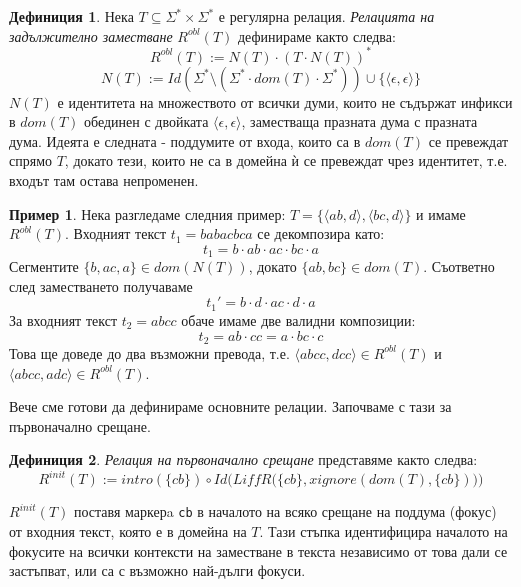 \documentclass[12pt, oneside]{article}
\theoremstyle{definition}
\newtheorem{definition}{Дефиниция}[section]
\newtheorem{example}{Пример}[section]
\begin{document}
\begin{definition}\label{def:Robl}
	Нека \(T \subseteq \Sigma^* \times \Sigma^* \) е регулярна релация. \emph{Релацията на задължително заместване} \(R^{obl}(T)\) дефинираме както следва:
	\[ R^{obl}(T) := N(T) \cdot (T \cdot N(T))^* \]
	\[ N(T) := Id(\Sigma^* \setminus (\Sigma^* \cdot dom(T) \cdot \Sigma^*)) \cup \{ \langle \epsilon, \epsilon \rangle \} \]
	\(N(T)\) е идентитета на множеството от всички думи, които не съдържат инфикси в \(dom(T)\) обединен с двойката \(\langle \epsilon, \epsilon \rangle\), заместваща празната дума с празната дума.
	Идеята е следната - поддумите от входа, които са в \(dom(T)\) се превеждат спрямо \(T\), докато тези, които не са в домейна ѝ се превеждат чрез идентитет, т.е. входът там остава непроменен.
\end{definition}

\begin{example}
	Нека разгледаме следния пример: \(T = \{ \langle ab, d \rangle, \langle bc, d \rangle \} \) и имаме \(R^{obl}(T) \). Входният текст \( t_1 = babacbca \) се декомпозира като:
	\[ t_1 = b \cdot ab \cdot ac \cdot bc \cdot a \]
	Сегментите \(\{b, ac, a\} \in dom(N(T))\), докато \(\{ab, bc\} \in dom(T)\). Съответно след заместването получаваме
	\[ t_1' = b \cdot d \cdot ac \cdot d \cdot a \]
	За входният текст \( t_2 = abcc \) обаче имаме две валидни композиции:
	\[ t_2 = ab \cdot cc = a \cdot bc \cdot c \]
	Това ще доведе до два възможни превода, т.е. \( \langle abcc, dcc \rangle \in R^{obl}(T) \) и \( \langle abcc, adc \rangle \in R^{obl}(T) \).
\end{example}

Вече сме готови да дефинираме основните релации. Започваме с тази за първоначално срещане.

\begin{definition}\label{def:Rinit} \emph{Релация на първоначално срещане} представяме както следва:
	\[ R^{init}(T) := intro(\{ cb \}) \circ Id \Big(LiffR \big(\{ cb \}, xignore(dom(T), \{ cb \}) \big) \Big) \]

	\( R^{init}(T) \) поставя маркерa \verb/cb/ в началото на всяко срещане на поддума (фокус) от входния текст, която е в домейна на \(T\). Тази стъпка идентифицира началото на фокусите на всички контексти на заместване в текста независимо от това дали се застъпват, или са с възможно най-дълги фокуси. 
\end{definition}
\end{document}
